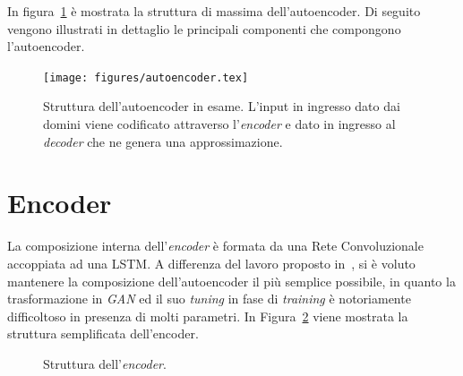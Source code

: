 In figura~\ref{fig:autoencoder1} è mostrata la struttura di massima dell'autoencoder. Di seguito vengono illustrati in dettaglio le principali componenti che compongono l'autoencoder. 

\begin{figure}[!p]
    \centering
	\texttt{[image: figures/autoencoder.tex]}
	\caption{Struttura dell'autoencoder in esame. L'input in ingresso dato dai domini viene codificato attraverso l'\textit{encoder} e dato in ingresso al \textit{decoder} che ne genera una approssimazione.
\label{fig:autoencoder1}}
\end{figure}

\newpage
\section{Encoder}
\label{encoder}
La composizione interna dell'\textit{encoder} è formata da una Rete Convoluzionale accoppiata ad una LSTM. A differenza del lavoro proposto in~\cite{deepdga}, si è voluto mantenere la composizione dell'autoencoder il più semplice possibile, in quanto la trasformazione in \textit{GAN} ed il suo \textit{tuning} in fase di \textit{training} è notoriamente difficoltoso in presenza di molti parametri. In Figura~\ref{fig:encoder} viene mostrata la struttura semplificata dell'encoder.

\begin{figure}[!p]
    \centering
	
	\caption{Struttura dell'\textit{encoder}.
\label{fig:encoder}}
\end{figure}

